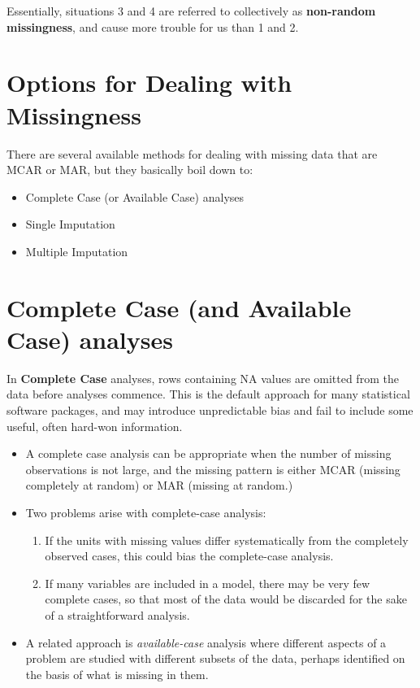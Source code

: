 \documentclass[]{book}
\providecommand{\tightlist}{%
  \setlength{\itemsep}{0pt}\setlength{\parskip}{0pt}}
\theoremstyle{definition}
\theoremstyle{definition}
\theoremstyle{definition}
\theoremstyle{remark}
\begin{document}
Essentially, situations 3 and 4 are referred to collectively as
\textbf{non-random missingness}, and cause more trouble for us than 1
and 2.

\section{Options for Dealing with
Missingness}\label{options-for-dealing-with-missingness}

There are several available methods for dealing with missing data that
are MCAR or MAR, but they basically boil down to:

\begin{itemize}
\tightlist
\item
  Complete Case (or Available Case) analyses
\item
  Single Imputation
\item
  Multiple Imputation
\end{itemize}

\section{Complete Case (and Available Case)
analyses}\label{complete-case-and-available-case-analyses}

In \textbf{Complete Case} analyses, rows containing NA values are
omitted from the data before analyses commence. This is the default
approach for many statistical software packages, and may introduce
unpredictable bias and fail to include some useful, often hard-won
information.

\begin{itemize}
\tightlist
\item
  A complete case analysis can be appropriate when the number of missing
  observations is not large, and the missing pattern is either MCAR
  (missing completely at random) or MAR (missing at random.)
\item
  Two problems arise with complete-case analysis:

  \begin{enumerate}
  \def\labelenumi{\arabic{enumi}.}
  \tightlist
  \item
    If the units with missing values differ systematically from the
    completely observed cases, this could bias the complete-case
    analysis.
  \item
    If many variables are included in a model, there may be very few
    complete cases, so that most of the data would be discarded for the
    sake of a straightforward analysis.
  \end{enumerate}
\item
  A related approach is \emph{available-case} analysis where different
  aspects of a problem are studied with different subsets of the data,
  perhaps identified on the basis of what is missing in them.
\end{itemize}
\end{document}
